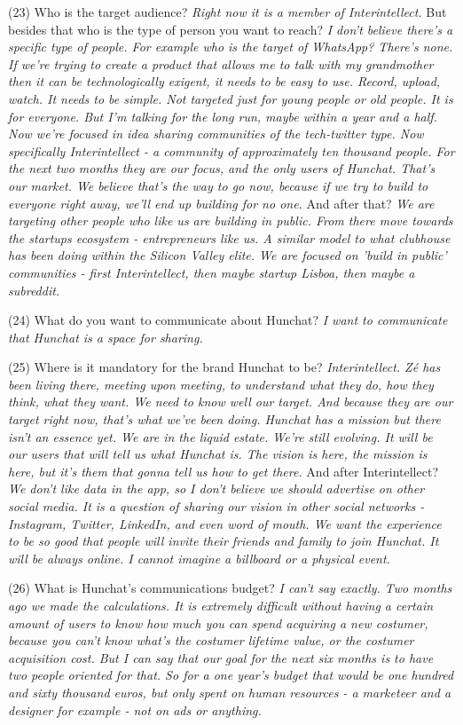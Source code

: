 \documentclass[12pt]{article}
\begin{document}
(23) Who is the target audience? \textit{Right now it is a member of Interintellect.} But besides that who is the type of person you want to reach? \textit{I don't believe there's a specific type of people. For example who is the target of WhatsApp? There's none. If we're trying to create a product that allows me to talk with my grandmother then it can be technologically exigent, it needs to be easy to use. Record, upload, watch. It needs to be simple. Not targeted just for young people or old people. It is for everyone. But I'm talking for the long run, maybe within a year and a half. Now we're focused in idea sharing communities of the tech-twitter type. Now specifically Interintellect - a community of approximately ten thousand people. For the next two months they are our focus, and the only users of Hunchat. That's our market. We believe that's the way to go now, because if we try to build to everyone right away, we'll end up building for no one.} And after that? \textit{We are targeting other people who like us are building in public. From there move towards the startups ecosystem - entrepreneurs like us. A similar model to what clubhouse has been doing within the Silicon Valley elite. We are focused on 'build in public' communities - first Interintellect, then maybe startup Lisboa, then maybe a subreddit.}

(24) What do you want to communicate about Hunchat? \textit{I want to communicate that Hunchat is a space for sharing.}

(25) Where is it mandatory for the brand Hunchat to be? \textit{Interintellect. Zé has been living there, meeting upon meeting, to understand what they do, how they think, what they want. We need to know well our target. And because they are our target right now, that's what we've been doing. Hunchat has a mission but there isn't an essence yet. We are in the liquid estate. We're still evolving. It will be our users that will tell us what Hunchat is. The vision is here, the mission is here, but it's them that gonna tell us how to get there.} And after Interintellect? \textit{We don't like data in the app, so I don't believe we should advertise on other social media. It is a question of sharing our vision in other social networks - Instagram, Twitter, LinkedIn, and even word of mouth. We want the experience to be so good that people will invite their friends and family to join Hunchat. It will be always online. I cannot imagine a billboard or a physical event.}

(26) What is Hunchat’s communications budget? \textit{I can't say exactly. Two months ago we made the calculations. It is extremely difficult without having a certain amount of users to know how much you can spend acquiring a new costumer, because you can't know what's the costumer lifetime value, or the costumer acquisition cost. But I can say that our goal for the next six months is to have two people oriented for that. So for a one year's budget that would be one hundred and sixty thousand euros, but only spent on human resources - a marketeer and a designer for example - not on ads or anything.}
\end{document}
